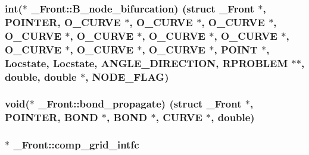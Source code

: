 \subsubsection[{\texorpdfstring{B\+\_\+node\+\_\+bifurcation}{B_node_bifurcation}}]{\setlength{\rightskip}{0pt plus 5cm}int($\ast$ \+\_\+\+Front\+::\+B\+\_\+node\+\_\+bifurcation) (struct {\bf \+\_\+\+Front} $\ast$, {\bf P\+O\+I\+N\+T\+ER}, {\bf O\+\_\+\+C\+U\+R\+VE} $\ast$, {\bf O\+\_\+\+C\+U\+R\+VE} $\ast$, {\bf O\+\_\+\+C\+U\+R\+VE} $\ast$, {\bf O\+\_\+\+C\+U\+R\+VE} $\ast$, {\bf O\+\_\+\+C\+U\+R\+VE} $\ast$, {\bf O\+\_\+\+C\+U\+R\+VE} $\ast$, {\bf O\+\_\+\+C\+U\+R\+VE} $\ast$, {\bf O\+\_\+\+C\+U\+R\+VE} $\ast$, {\bf O\+\_\+\+C\+U\+R\+VE} $\ast$, {\bf O\+\_\+\+C\+U\+R\+VE} $\ast$, {\bf P\+O\+I\+NT} $\ast$, {\bf Locstate}, {\bf Locstate}, {\bf A\+N\+G\+L\+E\+\_\+\+D\+I\+R\+E\+C\+T\+I\+ON}, {\bf R\+P\+R\+O\+B\+L\+EM} $\ast$$\ast$, double, double $\ast$, {\bf N\+O\+D\+E\+\_\+\+F\+L\+AG})}\hypertarget{struct___front_a28750ab6cd429a2fd79bdd13aaa7b0a7}{}\label{struct___front_a28750ab6cd429a2fd79bdd13aaa7b0a7}
\subsubsection[{\texorpdfstring{bond\+\_\+propagate}{bond_propagate}}]{\setlength{\rightskip}{0pt plus 5cm}void($\ast$ \+\_\+\+Front\+::bond\+\_\+propagate) (struct {\bf \+\_\+\+Front} $\ast$, {\bf P\+O\+I\+N\+T\+ER}, {\bf B\+O\+ND} $\ast$, {\bf B\+O\+ND} $\ast$, {\bf C\+U\+R\+VE} $\ast$, double)}\hypertarget{struct___front_adc0a185545fde2d025a4791af2d2206e}{}\label{struct___front_adc0a185545fde2d025a4791af2d2206e}
\subsubsection[{\texorpdfstring{comp\+\_\+grid\+\_\+intfc}{comp_grid_intfc}}]{$\ast$ \+\_\+\+Front\+::comp\+\_\+grid\+\_\+intfc}\hypertarget{struct___front_a904eac2d0eb98d025c39d2400a0e2d92}{}\label{struct___front_a904eac2d0eb98d025c39d2400a0e2d92}
